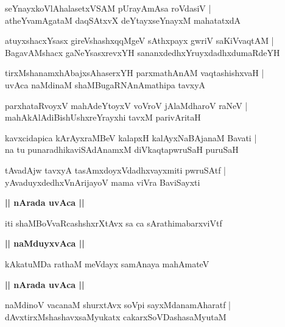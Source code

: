 \documentclass[twoside,12pt,openright]{book}
\newcounter{shloka}[chapter]
\def\uvaca#1{\centerline{{\large\textbf{#1}}}}
\begin{document}
\begin{shloka}%
seYnayxkoVlAhalasetxVSAM pUrayAmAsa roVdasiV |\\
atheYvamAgataM daqSAtxvX deYtayxseYnayxM mahatatxdA 
\end{shloka}

\begin{shloka}%
atuyxshacxYsasx gireVshashxqqMgeV sAthxpayx gwriV saKiVvaqtAM |\\
BagavAMshacx gaNeYsasxrevxYH sananxdedhxYruyxdadhxdumaRdeYH 
\end{shloka}


\begin{shloka}%
tirxMshanamxhAbajxsAhaserxYH parxmathAnAM vaqtashishxvaH |\\
uvAca naMdinaM shaMBugaRNAnAmathipa tavxyA 
\end{shloka}

\begin{shloka}%
parxhataRvoyxV mahAdeYtoyxV voVroV jAlaMdharoV raNeV |\\
mahAkAlAdiBishUshxreYrayxhi tavxM parivAritaH 
\end{shloka}

\begin{shloka}%
kavxcidapica kArAyxraMBeV kalapxH kalAyxNaBAjanaM Bavati |\\
na tu punaradhikaviSAdAnamxM diVkaqtapwruSaH puruSaH 
\end{shloka}

\begin{shloka}%
tAvadAjw tavxyA tasAmxdoyxVdadhxvayxmiti pwruSAtf |\\
yAvaduyxdedhxVnArijayoV mama viVra BaviSayxti
\end{shloka}

\uvaca{|| nArada uvAca ||}

\begin{shloka}%
iti shaMBoVvaRcashshxrXtAvx sa ca sArathimabarxviVtf 
\end{shloka}

\uvaca{|| naMduyxvAca ||}

\begin{shloka}%
kAkatuMDa rathaM meVdayx samAnaya mahAmateV 
\end{shloka}

\uvaca{|| nArada uvAca ||}

\begin{shloka}%
naMdinoV vacanaM shurxtAvx soVpi sayxMdanamAharatf |\\
dAvxtirxMshashavxsaMyukatx cakarxSoVDashasaMyutaM 
\end{shloka}
\end{document}
